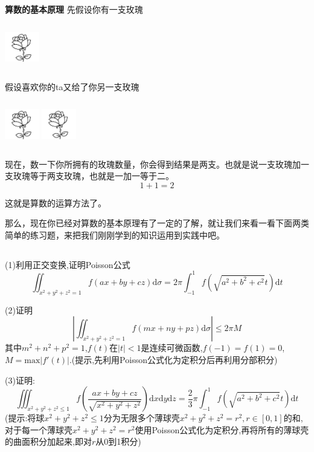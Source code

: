 \documentclass{ctexart}
\begin{document}
\textbf{算数的基本原理}
\newline
\newline
\indent 先假设你有一支玫瑰

\includegraphics[width=1.5cm,height=2cm]{1.jpg}



假设喜欢你的ta又给了你另一支玫瑰

\includegraphics[width=1.5cm,height=2cm]{1.jpg}
\includegraphics[width=1.5cm,height=2cm]{1.jpg}



现在，数一下你所拥有的玫瑰数量，你会得到结果是两支。也就是说一支玫瑰加一支玫瑰等于两支玫瑰，也就是一加一等于二。$$1+1=2$$

这就是算数的运算方法了。


那么，现在你已经对算数的基本原理有了一定的了解，就让我们来看一看下面两类简单的练习题，来把我们刚刚学到的知识运用到实践中吧。
\newline
\newline
{}

\subsection*{}

(1)利用正交变换,证明Poisson公式$$\iint_{x^{2}+y^{2}+z^{2}=1}f(ax+by+cz)\mathrm{d}\sigma=2\pi\int_{-1}^{1}f(\sqrt{a^{2}+b^{2}+c^{2}}t)\mathrm{d}t$$


(2)证明$$\left|\iint_{x^{2}+y^{2}+z^{2}=1}f(mx+ny+pz)\mathrm{d}\sigma\right|\leq 2\pi M$$
其中$m^{2}+n^{2}+p^{2}=1$,$f(t)$在$|t|<1$是连续可微函数,$f(-1)=f(1)=0$,$M=\mathrm{max}|f'(t)|$.(提示,先利用Poisson公式化为定积分后再利用分部积分)

(3)证明:
$$\iiint_{x^{2}+y^{2}+z^{2}\leq1}f\left(\frac{ax+by+cz}{\sqrt{x^{2}+y^{2}+z^{2}}}\right)\mathrm{d}x\mathrm{d}y\mathrm{d}z=
\frac{2}{3}\pi\int_{-1}^{1}f(\sqrt{a^{2}+b^{2}+c^{2}}t)\mathrm{d}t$$
(提示:将球$x^{2}+y^{2}+z^{2}\leq1$分为无限多个薄球壳$x^{2}+y^{2}+z^{2}=r^{2},r\in [0,1]$的和,对于每一个薄球壳$x^{2}+y^{2}+z^{2}=r^{2}$使用Poisson公式化为定积分,再将所有的薄球壳的曲面积分加起来,即对$r$从0到1积分)
\end{document}
